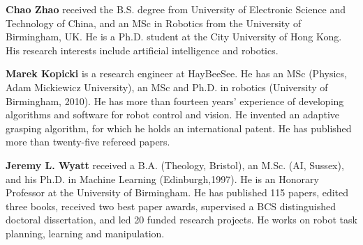 \documentclass{ws-ijhr}
\begin{document}
\vspace*{13pt}  
\noindent%
\parbox{5truein}{
\begin{minipage}[b]{1truein}
\centerline{{}}
\end{minipage}
\hfill %
\begin{minipage}[b]{3.85truein}
{{\bf Chao Zhao} received the B.S. degree from University of Electronic Science and Technology of China, and an MSc in Robotics from the University of Birmingham, UK. He is a Ph.D. student at the City University of Hong Kong. His research interests include artificial intelligence and robotics.\hfilneg}
\end{minipage}} %


\vspace*{13pt}  
\noindent%
\parbox{5truein}{
\begin{minipage}[b]{1truein}
\centerline{{}}
\end{minipage}
\hfill %
\begin{minipage}[b]{3.85truein}
{{\bf Marek Kopicki} is a research engineer at HayBeeSee. He has an MSc (Physics, Adam Mickiewicz University), an MSc and Ph.D. in robotics (University of Birmingham, 2010). He has more than fourteen years’ experience of developing algorithms and software for robot control and vision. He invented an adaptive grasping algorithm, for which he holds an international patent. He has published more than twenty-five refereed papers.\hfilneg}
\end{minipage}} %

\vspace*{13pt}  
\noindent%
\parbox{5truein}{
\begin{minipage}[b]{1truein}
\centerline{{}}
\end{minipage}
\hfill %
\begin{minipage}[b]{3.85truein}
{{\bf Jeremy L. Wyatt}
received a B.A. (Theology, Bristol), an M.Sc. (AI, Sussex), and his Ph.D. in Machine Learning (Edinburgh,1997). He is an Honorary Professor at the University of Birmingham. He has published 115 papers, edited three books, received two best paper awards, supervised a BCS distinguished doctoral dissertation, and led 20 funded research projects. He works on robot task planning, learning and manipulation. \hfilneg}
\end{minipage}} %


\vfill\eject
\end{document}

